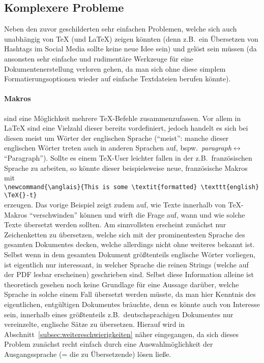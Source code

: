 \newpage
\subsection{Komplexere Probleme}
Neben den zuvor geschilderten sehr einfachen Problemen, welche sich auch unabhängig von \TeX{} (und \LaTeX{}) zeigen könnten (denn z.B.\ ein Übersetzen von Hashtags im Social Media sollte keine neue Idee sein) und gelöst sein müssen (da ansonsten sehr einfache und rudimentäre Werkzeuge für eine Dokumentenerstellung verloren gehen, da man sich ohne diese simplem Formatierungsoptionen wieder auf einfache Textdateien berufen könnte).%

\paragraph*{Makros} sind eine Möglichkeit mehrere \TeX{}-Befehle zusammenzufassen. Vor allem in \LaTeX{} sind eine Vielzahl dieser bereits vordefiniert, jedoch handelt es sich bei diesen meist um Wörter der englischen Sprache (\enquote{meist}: manche dieser englischen Wörter treten auch in anderen Sprachen auf, bspw.\ \textit{paragraph}$\leftrightarrow$\enquote{Paragraph}). Sollte es einem \TeX{}-User leichter fallen in der z.B.\ französischen Sprache zu arbeiten, so könnte dieser beispielsweise neue, französische Makros mit \\\verb|\newcommand{\anglais}{This is some \textit{formatted} \texttt{english} \TeX{}-t}|\\erzeugen. Das vorige Beispiel zeigt zudem auf, wie Texte innerhalb von \TeX{}-Makros \enquote{verschwinden} können und wirft die Frage auf, wann und wie solche Texte übersetzt werden sollten. Am sinnvollsten erscheint zunächst nur Zeichenketten zu übersetzen, welche sich mit der prominentesten Sprache des gesamten Dokumentes decken, welche allerdings nicht ohne weiteres bekannt ist. Selbst wenn in dem gesamten Dokument größtenteils englische Wörter vorliegen, ist eigentlich nur interessant, in welcher Sprache die reinen Strings (welche auf der PDF lesbar erscheinen) geschrieben sind. Selbst diese Information alleine ist theoretisch gesehen noch keine Grundlage für eine Aussage darüber, welche Sprache in solche einem Fall übersetzt werden müsste, da man hier Kenntnis des eigentlichen, entgültigen Dokumentes bräuchte, denn es könnte auch von Interesse sein, innerhalb eines größtenteils z.B.\ deutschsprachigen Dokumentes nur vereinzelte, englische Sätze zu übersetzen. Hierauf wird in Abschnitt~\ref{subsec:weitereschwierigkeiten} näher eingegangen, da sich dieses Problem zunächst recht einfach durch eine Auswahlmöglichkeit der Ausgangssprache (= die zu Übersetzende) lösen ließe.\\%
